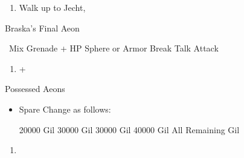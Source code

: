 	\begin{enumerate}[resume]
		\item Walk up to Jecht, \cs[4:30]
	\end{enumerate}
	\bothvfill\winvfill\lossvfill
	\begin{battle}[180000]{Braska's Final Aeon}
		\begin{itemize}
			\switch{\yuna}{\rikku}
			\rikkuf \od\ Mix Grenade + HP Sphere or Armor Break
			\tidusf Talk
			\switch{\auron}{\yuna}
			\summon{\bahamut}
			\bahamutf Attack
		\end{itemize}
	\end{battle}
\colend
\begin{enumerate}[resume]
	\item \cs+\skippablefmv[4:00]
\end{enumerate}
\begin{battle}{Possessed  Aeons}
	\begin{itemize}
		\item Spare Change as follows:
		      \begin{itemize}
			      \valeforf \num{20000} Gil
			      \ifritf \num{30000} Gil
			      \ixilonf \num{30000} Gil
			      \bahamutf \num{40000} Gil
			      \shivaf All Remaining Gil
		      \end{itemize}
	\end{itemize}
\end{battle}
\begin{enumerate}[resume]
	\item \cs[1:40]
\end{enumerate}
